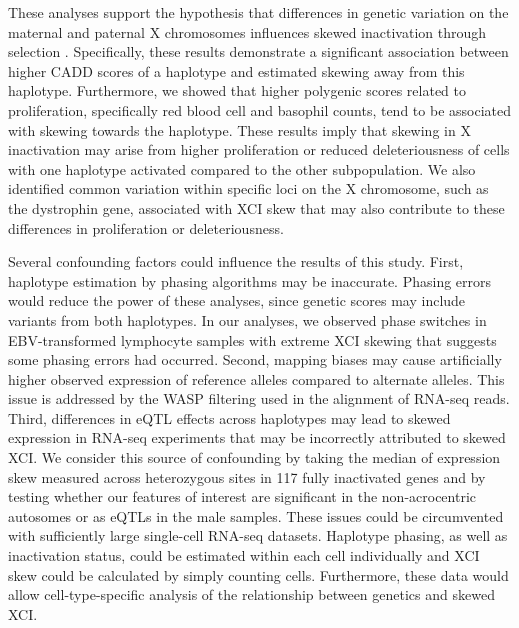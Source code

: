 These analyses support the hypothesis that differences in genetic variation on the maternal and paternal X chromosomes influences skewed inactivation through selection \cite{Brown1999-dc,Migeon1998-gc}. Specifically, these results demonstrate a significant association between higher CADD scores of a haplotype and estimated skewing away from this haplotype. Furthermore, we showed that higher polygenic scores related to proliferation, specifically red blood cell and basophil counts, tend to be associated with skewing towards the haplotype. These results imply that skewing in X inactivation may arise from higher proliferation or reduced deleteriousness of cells with one haplotype activated compared to the other subpopulation. We also identified common variation within specific loci on the X chromosome, such as the dystrophin gene, associated with XCI skew that may also contribute to these differences in proliferation or deleteriousness.

Several confounding factors could influence the results of this study. First, haplotype estimation by phasing algorithms may be inaccurate. Phasing errors would reduce the power of these analyses, since genetic scores may include variants from both haplotypes. In our analyses, we observed phase switches in EBV-transformed lymphocyte samples with extreme XCI skewing that suggests some phasing errors had occurred. Second, mapping biases may cause artificially higher observed expression of reference alleles compared to alternate alleles. This issue is addressed by the WASP filtering \cite{Van_de_Geijn2015-oy} used in the alignment of RNA-seq reads. Third, differences in eQTL effects across haplotypes may lead to skewed expression in RNA-seq experiments that may be incorrectly attributed to skewed XCI. We consider this source of confounding by taking the median of expression skew measured across heterozygous sites in 117 fully inactivated genes and by testing whether our features of interest are significant in the non-acrocentric autosomes or as eQTLs in the male samples. These issues could be circumvented with sufficiently large single-cell RNA-seq datasets. Haplotype phasing, as well as inactivation status, could be estimated within each cell individually and XCI skew could be calculated by simply counting cells. Furthermore, these data would allow cell-type-specific analysis of the relationship between genetics and skewed XCI.  

